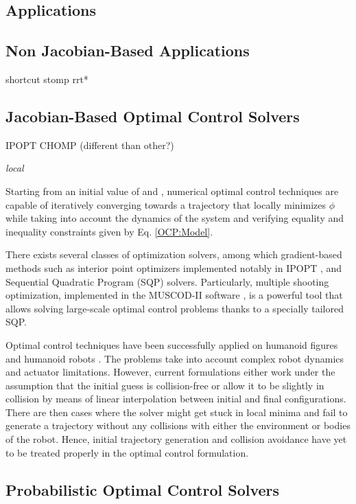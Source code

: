 \subsection{Applications}

\subsection{Non Jacobian-Based Applications}
shortcut
stomp
rrt*

\subsection{Jacobian-Based Optimal Control Solvers}

IPOPT
CHOMP (different than other?)

\emph{local}

Starting from an initial value of \state{} and \control{}, numerical
optimal control techniques are capable of iteratively converging
towards a trajectory that locally minimizes $\phi$ while taking into
account the dynamics of the system and verifying equality and
inequality constraints given by Eq. \ref{OCP:Model}.

There exists several classes of optimization solvers, among which
gradient-based methods such as interior point optimizers implemented
notably in IPOPT \cite{Biegler2009}, and Sequential Quadratic Program
(SQP) solvers. Particularly, multiple shooting optimization,
implemented in the \textsc{MUSCOD-II} software \cite{Leineweber2003},
is a powerful tool that allows solving large-scale optimal control
problems thanks to a specially tailored SQP.

Optimal control techniques have been successfully applied on humanoid
figures \cite{Schultz2010} and humanoid robots \cite{Toussaint2007,
  Lengagne2010}. The problems take into account complex robot dynamics
and actuator limitations. However, current formulations either work
under the assumption that the initial guess is collision-free or allow
it to be slightly in collision by means of linear interpolation
between initial and final configurations. There are then cases where
the solver might get stuck in local minima and fail to generate a
trajectory without any collisions with either the environment or
bodies of the robot. Hence, initial trajectory generation and
collision avoidance have yet to be treated properly in the optimal
control formulation.

\subsection{Probabilistic Optimal Control Solvers}

